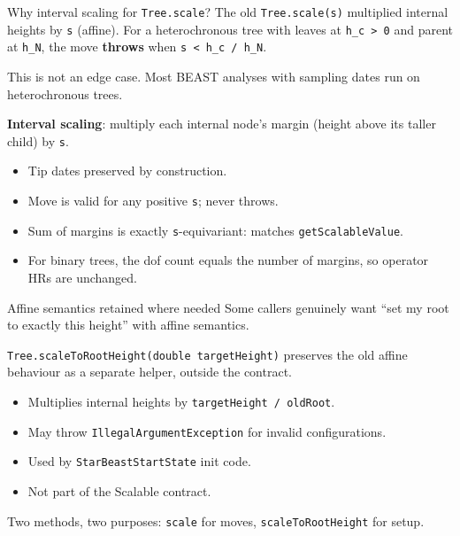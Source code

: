 \documentclass[aspectratio=169,11pt]{beamer}
\newcommand{\code}[1]{\texttt{#1}}
\begin{document}
\begin{frame}{Why interval scaling for \texttt{Tree.scale}?}
The old \code{Tree.scale(s)} multiplied internal heights by \code{s} (affine).
For a heterochronous tree with leaves at \code{h\_c > 0} and parent at \code{h\_N},
the move \textbf{throws} when \code{s < h\_c / h\_N}.

\vspace{1em}

This is not an edge case.
Most BEAST analyses with sampling dates run on heterochronous trees.

\vspace{1em}

\textbf{Interval scaling}: multiply each internal node's margin (height above its taller child) by \code{s}.

\begin{itemize}
\item Tip dates preserved by construction.
\item Move is valid for any positive \code{s}; never throws.
\item Sum of margins is exactly \code{s}-equivariant: matches \code{getScalableValue}.
\item For binary trees, the dof count equals the number of margins,
so operator HRs are unchanged.
\end{itemize}
\end{frame}

\begin{frame}{Affine semantics retained where needed}
Some callers genuinely want ``set my root to exactly this height'' with affine semantics.

\vspace{1em}

\code{Tree.scaleToRootHeight(double targetHeight)} preserves the old affine behaviour as a separate helper, outside the contract.

\begin{itemize}
\item Multiplies internal heights by \code{targetHeight / oldRoot}.
\item May throw \code{IllegalArgumentException} for invalid configurations.
\item Used by \code{StarBeastStartState} init code.
\item Not part of the Scalable contract.
\end{itemize}

\vspace{1em}

Two methods, two purposes: \code{scale} for moves, \code{scaleToRootHeight} for setup.
\end{frame}
\end{document}
